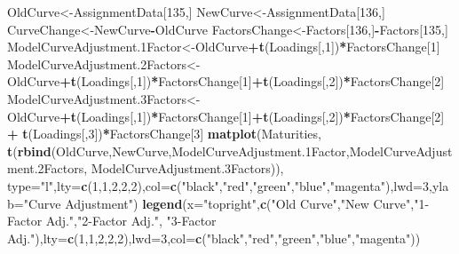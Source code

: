 \documentclass[]{article}
\newenvironment{Shaded}{\begin{snugshade}}{\end{snugshade}}
\newcommand{\KeywordTok}[1]{\textcolor[rgb]{0.13,0.29,0.53}{\textbf{#1}}}
\newcommand{\DataTypeTok}[1]{\textcolor[rgb]{0.13,0.29,0.53}{#1}}
\newcommand{\DecValTok}[1]{\textcolor[rgb]{0.00,0.00,0.81}{#1}}
\newcommand{\StringTok}[1]{\textcolor[rgb]{0.31,0.60,0.02}{#1}}
\newcommand{\OperatorTok}[1]{\textcolor[rgb]{0.81,0.36,0.00}{\textbf{#1}}}
\newcommand{\NormalTok}[1]{#1}
\begin{document}
\begin{Shaded}
\begin{Highlighting}[]
\NormalTok{OldCurve<-AssignmentData[}\DecValTok{135}\NormalTok{,]}
\NormalTok{NewCurve<-AssignmentData[}\DecValTok{136}\NormalTok{,]}
\NormalTok{CurveChange<-NewCurve}\OperatorTok{-}\NormalTok{OldCurve}
\NormalTok{FactorsChange<-Factors[}\DecValTok{136}\NormalTok{,]}\OperatorTok{-}\NormalTok{Factors[}\DecValTok{135}\NormalTok{,]}
\NormalTok{ModelCurveAdjustment.1Factor<-OldCurve}\OperatorTok{+}\KeywordTok{t}\NormalTok{(Loadings[,}\DecValTok{1}\NormalTok{])}\OperatorTok{*}\NormalTok{FactorsChange[}\DecValTok{1}\NormalTok{]}
\NormalTok{ModelCurveAdjustment.2Factors<-OldCurve}\OperatorTok{+}\KeywordTok{t}\NormalTok{(Loadings[,}\DecValTok{1}\NormalTok{])}\OperatorTok{*}\NormalTok{FactorsChange[}\DecValTok{1}\NormalTok{]}\OperatorTok{+}\KeywordTok{t}\NormalTok{(Loadings[,}\DecValTok{2}\NormalTok{])}\OperatorTok{*}\NormalTok{FactorsChange[}\DecValTok{2}\NormalTok{]}
\NormalTok{ModelCurveAdjustment.3Factors<-OldCurve}\OperatorTok{+}\KeywordTok{t}\NormalTok{(Loadings[,}\DecValTok{1}\NormalTok{])}\OperatorTok{*}\NormalTok{FactorsChange[}\DecValTok{1}\NormalTok{]}\OperatorTok{+}\KeywordTok{t}\NormalTok{(Loadings[,}\DecValTok{2}\NormalTok{])}\OperatorTok{*}\NormalTok{FactorsChange[}\DecValTok{2}\NormalTok{]}\OperatorTok{+}
\StringTok{  }\KeywordTok{t}\NormalTok{(Loadings[,}\DecValTok{3}\NormalTok{])}\OperatorTok{*}\NormalTok{FactorsChange[}\DecValTok{3}\NormalTok{]}
\KeywordTok{matplot}\NormalTok{(Maturities,}
        \KeywordTok{t}\NormalTok{(}\KeywordTok{rbind}\NormalTok{(OldCurve,NewCurve,ModelCurveAdjustment.1Factor,ModelCurveAdjustment.2Factors,}
\NormalTok{                ModelCurveAdjustment.3Factors)),}
        \DataTypeTok{type=}\StringTok{"l"}\NormalTok{,}\DataTypeTok{lty=}\KeywordTok{c}\NormalTok{(}\DecValTok{1}\NormalTok{,}\DecValTok{1}\NormalTok{,}\DecValTok{2}\NormalTok{,}\DecValTok{2}\NormalTok{,}\DecValTok{2}\NormalTok{),}\DataTypeTok{col=}\KeywordTok{c}\NormalTok{(}\StringTok{"black"}\NormalTok{,}\StringTok{"red"}\NormalTok{,}\StringTok{"green"}\NormalTok{,}\StringTok{"blue"}\NormalTok{,}\StringTok{"magenta"}\NormalTok{),}\DataTypeTok{lwd=}\DecValTok{3}\NormalTok{,}\DataTypeTok{ylab=}\StringTok{"Curve Adjustment"}\NormalTok{)}
\KeywordTok{legend}\NormalTok{(}\DataTypeTok{x=}\StringTok{"topright"}\NormalTok{,}\KeywordTok{c}\NormalTok{(}\StringTok{"Old Curve"}\NormalTok{,}\StringTok{"New Curve"}\NormalTok{,}\StringTok{"1-Factor Adj."}\NormalTok{,}\StringTok{"2-Factor Adj."}\NormalTok{,}
                      \StringTok{"3-Factor Adj."}\NormalTok{),}\DataTypeTok{lty=}\KeywordTok{c}\NormalTok{(}\DecValTok{1}\NormalTok{,}\DecValTok{1}\NormalTok{,}\DecValTok{2}\NormalTok{,}\DecValTok{2}\NormalTok{,}\DecValTok{2}\NormalTok{),}\DataTypeTok{lwd=}\DecValTok{3}\NormalTok{,}\DataTypeTok{col=}\KeywordTok{c}\NormalTok{(}\StringTok{"black"}\NormalTok{,}\StringTok{"red"}\NormalTok{,}\StringTok{"green"}\NormalTok{,}\StringTok{"blue"}\NormalTok{,}\StringTok{"magenta"}\NormalTok{))}
\end{Highlighting}
\end{Shaded}
\end{document}
